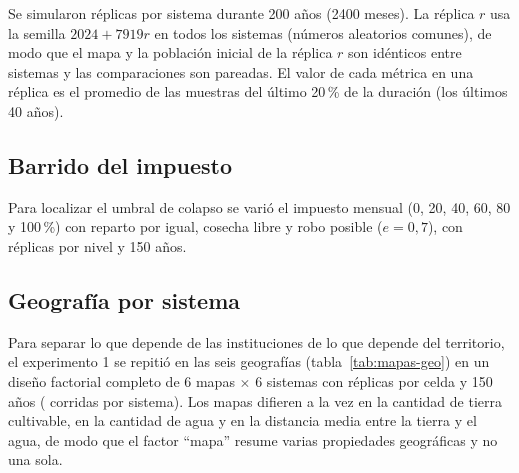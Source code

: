 \documentclass[11pt,a4paper]{article}
\begin{document}
\begin{table}[htbp]\centering\small
\caption{Reglas que definen cada sistema económico.}\label{tab:sistemas-reglas}
\end{table}

Se simularon \nReplicas{} réplicas por sistema durante 200 años (2400 meses). La réplica $r$ usa la semilla $2024+7919r$ en todos los sistemas (números aleatorios comunes), de modo que el mapa y la población inicial de la réplica $r$ son idénticos entre sistemas y las comparaciones son pareadas. El valor de cada métrica en una réplica es el promedio de las muestras del último 20\,\% de la duración (los últimos 40 años).

\subsection{Barrido del impuesto}
Para localizar el umbral de colapso se varió el impuesto mensual (0, 20, 40, 60, 80 y 100\,\%) con reparto por igual, cosecha libre y robo posible ($e=0{,}7$), con \nReplicasImp{} réplicas por nivel y 150 años.

\subsection{Geografía por sistema}
Para separar lo que depende de las instituciones de lo que depende del territorio, el experimento 1 se repitió en las seis geografías (tabla~\ref{tab:mapas-geo}) en un diseño factorial completo de 6 mapas $\times$ 6 sistemas con \nRepMapas{} réplicas por celda y 150 años (\corridasPorSistema{} corridas por sistema). Los mapas difieren a la vez en la cantidad de tierra cultivable, en la cantidad de agua y en la distancia media entre la tierra y el agua, de modo que el factor ``mapa'' resume varias propiedades geográficas y no una sola.
\end{document}
